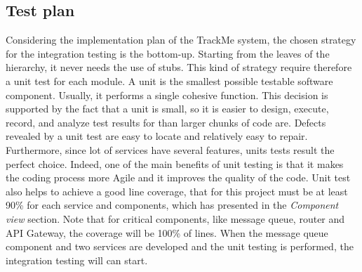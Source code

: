\subsection{Test plan}
Considering the implementation plan of the TrackMe system, the chosen strategy for the integration testing is the bottom-up. Starting from the leaves of the hierarchy, it never needs the use of stubs. This kind of strategy require therefore a unit test for each module. A unit is the smallest possible testable software component. Usually, it performs a single cohesive function. This decision is supported by the fact that a unit is small, so it is easier to design, execute, record, and analyze test results for than larger chunks of code are. Defects revealed by a unit test are easy to locate and relatively easy to repair. Furthermore, since lot of services have several features, units tests result the perfect choice. Indeed, one of the main benefits of unit testing is that it makes the coding process more Agile and it improves the quality of the code. Unit test also helps to achieve a good line coverage, that for this project must be at least 90\% for each service and components, which has presented in the \textit{Component view} section. Note that for critical components, like message queue, router and API Gateway, the coverage will be 100\% of lines. When the message queue component and two services are developed and the unit testing is performed, the integration testing will can start. 

